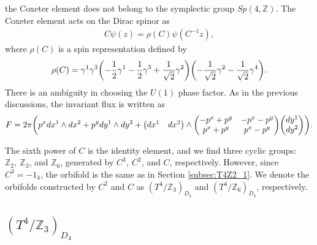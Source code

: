 \documentclass[11pt]{article}
\begin{document}
the Coxeter element does not belong to the symplectic group $Sp(4,\mathbb{Z})$. The Coxeter element acts on the Dirac spinor as
\begin{align}
    C\psi(z)= \rho(C) \psi(C^{-1}z),
\end{align}
where $\rho(C)$ is a spin representation defined by
\begin{align}
    \rho(C)= \gamma^1 \gamma^3 \qty(-\frac{1}{2}\gamma^1 -\frac{1}{2}\gamma^3+ \frac{1}{\sqrt{2}}\gamma^2 )  \qty(-\frac{1}{\sqrt{2}}\gamma^2-\frac{1}{\sqrt{2}}\gamma^4).
\end{align}
There is an ambiguity in choosing the $U(1)$ phase factor. As in the previous discussions, the invariant flux is written as
\begin{align}
    F=2\pi \qty( p^x dx^1 \wedge dx^2 + p^y dy^1 \wedge dy^2 + \mqty(dx^1 & dx^2) \wedge \mqty( -p^x+p^y & -p^x-p^y \\ p^x +p^y & p^x -p^y) \mqty(dy^1 \\ dy^2)  ).
\end{align}


The sixth power of $C$ is the identity element, and we find three cyclic groups: $\mathbb{Z}_2,~\mathbb{Z}_3$, and $\mathbb{Z}_6$, generated by $C^3,~C^2$, and $C$, respectively. However, since $C^3=-1_4$, the orbifold is the same as in Section \ref{subsec:T4Z2_1}. We denote the orbifolds constructed by $C^2$ and $C$ as $(T^4/\mathbb{Z}_3)_{D_4}$ and $(T^4/\mathbb{Z}_6)_{D_4}$, respectively.  %






\subsection{$(T^4/\mathbb{Z}_3)_{D_4}$}
\end{document}
